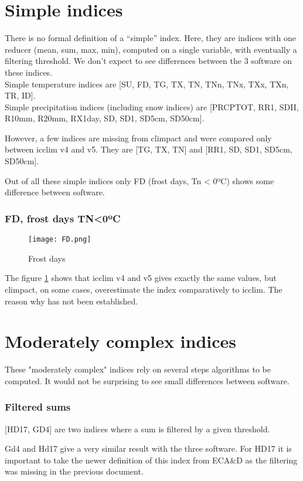 \documentclass[a4paper,11pt]{article}
\begin{document}
\part{Simple indices}
    There is no formal definition of a “simple” index. Here, they are indices with one reducer (mean, sum, max, min), computed on a single variable, with eventually a filtering threshold. We don't expect to see differences between the 3 software on these indices.\\
    Simple temperature indices are [SU, FD, TG, TX, TN, TNn, TNx, TXx, TXn, TR, ID].\\
    Simple precipitation indices (including snow indices) are [PRCPTOT, RR1, SDII, R10mm, R20mm, RX1day, SD, SD1, SD5cm, SD50cm].

    However, a few indices are missing from climpact and were compared only between icclim v4 and v5. They are [TG, TX, TN] and [RR1, SD, SD1, SD5cm, SD50cm].

    Out of all these simple indices only FD (frost days, Tn < 0ºC) shows some difference between software.

    \section{FD, frost days TN<0ºC}
        \begin{figure}[!hbt]
            \centering
            \texttt{[image: FD.png]}
            \caption{Frost days}
            \label{figure/fd}
        \end{figure}
        The figure \ref{figure/fd} shows that icclim v4 and v5 gives exactly the same values, but climpact, on some cases, overestimate the index comparatively to icclim.
        The reason why has not been established.
        

\part{Moderately complex indices}
    These "moderately complex" indices rely on several steps algorithms to be computed.
    It would not be surprising to see small differences between software.

    \section{Filtered sums}
        [HD17, GD4] are two indices where a sum is filtered by a given threshold.

        Gd4 and Hd17 give a very similar result with the three software.
        For HD17 it is important to take the newer definition of this index from ECA\&D \cite{doc/ecad_new} as the filtering was missing in the previous document.
\end{document}
